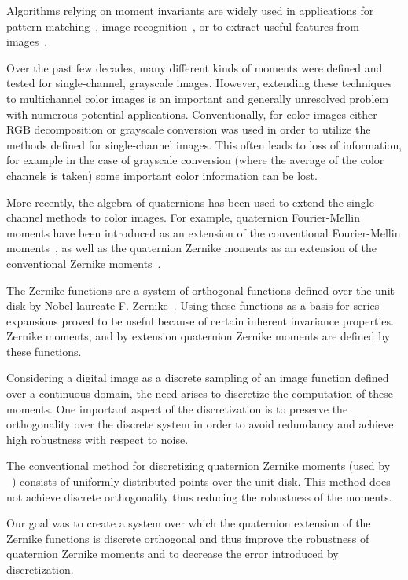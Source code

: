 Algorithms relying on moment invariants are widely used in applications for pattern matching~\cite{app2}, image recognition~\cite{pattern_recognition}, or to extract useful features from images~\cite{zernike_nn}.

Over the past few decades, many different kinds of moments were defined and tested for single-channel, grayscale images. However, extending these techniques to multichannel color images is an important and generally unresolved problem with numerous potential applications. Conventionally, for color images either RGB decomposition or grayscale conversion was used in order to utilize the methods defined for single-channel images. This often leads to loss of information, for example in the case of grayscale conversion (where the average of the color channels is taken) some important color information can be lost.

More recently, the algebra of quaternions has been used to extend the single-channel methods to color images. For example, quaternion Fourier-Mellin moments have been introduced as an extension of the conventional Fourier-Mellin moments~\cite{qfmm}, as well as the quaternion Zernike moments as an extension of the conventional Zernike moments~\cite{qzm}.

The Zernike functions are a system of orthogonal functions defined over the unit disk by Nobel laureate F. Zernike~\cite{zernike}. Using these functions as a basis for series expansions proved to be useful because of certain inherent invariance properties. Zernike moments, and by extension quaternion Zernike moments are defined by these functions.

Considering a digital image as a discrete sampling of an image function defined over a continuous domain, the need arises to discretize the computation of these moments. One important aspect of the discretization is to preserve the orthogonality over the discrete system in order to avoid redundancy and achieve high robustness with respect to noise.

The conventional method for discretizing quaternion Zernike moments (used by \citeauthor{qzmi}~\cite{qzmi}) consists of uniformly distributed points over the unit disk. This method does not achieve discrete orthogonality thus reducing the robustness of the moments. 

Our goal was to create a system over which the quaternion extension of the Zernike functions is discrete orthogonal and thus improve the robustness of quaternion Zernike moments and to decrease the error introduced by discretization.


